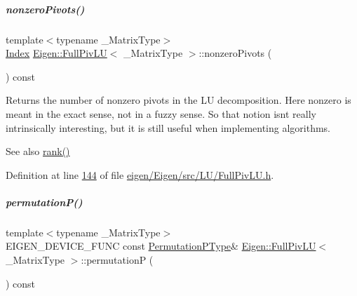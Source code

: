 \mbox{\label{group___l_u___module_aa71132a751ad3c78178e33d6b2987400}} 
\subparagraph{\texorpdfstring{nonzero\+Pivots()}{nonzeroPivots()}\hspace{0.1cm}{\footnotesize\ttfamily [2/2]}}
{\footnotesize\ttfamily template$<$typename \+\_\+\+Matrix\+Type$>$ \\
\hyperlink{group___core___module_a554f30542cc2316add4b1ea0a492ff02}{Index} \hyperlink{group___l_u___module_class_eigen_1_1_full_piv_l_u}{Eigen\+::\+Full\+Piv\+LU}$<$ \+\_\+\+Matrix\+Type $>$\+::nonzero\+Pivots (\begin{DoxyParamCaption}{ }\end{DoxyParamCaption}) const\hspace{0.3cm}{\ttfamily [inline]}}

\begin{DoxyReturn}{Returns}
the number of nonzero pivots in the LU decomposition. Here nonzero is meant in the exact sense, not in a fuzzy sense. So that notion isn\textquotesingle{}t really intrinsically interesting, but it is still useful when implementing algorithms.
\end{DoxyReturn}
\begin{DoxySeeAlso}{See also}
\hyperlink{group___l_u___module_a67a870aa69e699e058d04802ba0bdad9}{rank()} 
\end{DoxySeeAlso}


Definition at line \hyperlink{eigen_2_eigen_2src_2_l_u_2_full_piv_l_u_8h_source_l00144}{144} of file \hyperlink{eigen_2_eigen_2src_2_l_u_2_full_piv_l_u_8h_source}{eigen/\+Eigen/src/\+L\+U/\+Full\+Piv\+L\+U.\+h}.

\mbox{\label{group___l_u___module_a09274c82240f6441af5e6c99e24e756d}} 
\subparagraph{\texorpdfstring{permutation\+P()}{permutationP()}\hspace{0.1cm}{\footnotesize\ttfamily [1/2]}}
{\footnotesize\ttfamily template$<$typename \+\_\+\+Matrix\+Type$>$ \\
E\+I\+G\+E\+N\+\_\+\+D\+E\+V\+I\+C\+E\+\_\+\+F\+U\+NC const \hyperlink{group___core___module}{Permutation\+P\+Type}\& \hyperlink{group___l_u___module_class_eigen_1_1_full_piv_l_u}{Eigen\+::\+Full\+Piv\+LU}$<$ \+\_\+\+Matrix\+Type $>$\+::permutationP (\begin{DoxyParamCaption}{ }\end{DoxyParamCaption}) const\hspace{0.3cm}{\ttfamily [inline]}}

